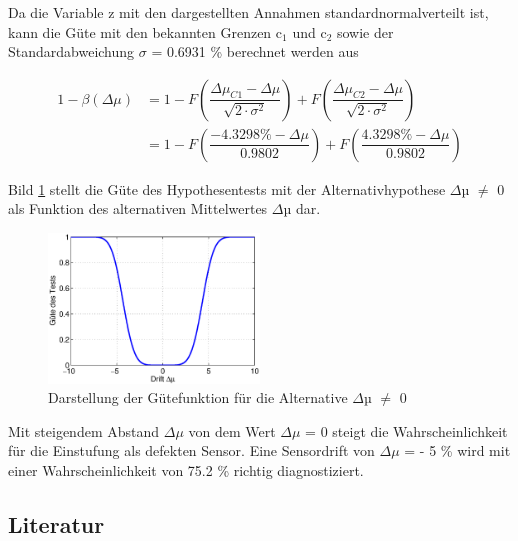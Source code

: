 \noindent Da die Variable z mit den dargestellten Annahmen standardnormalverteilt ist, kann die G\"{u}te mit den bekannten Grenzen c$_{1}$ und c$_{2}$ sowie der Standardabweichung $\sigma$ = 0.6931 \% berechnet werden aus 

\begin{equation}\label{eq:sixonehundredseventysix}
\begin{split}
1-\beta \left(\Delta \mu \right) & = 1-F\left(\dfrac{\Delta \mu _{C1} -\Delta \mu }{\sqrt{2\cdot \sigma ^{2}}} \right)+F\left(\dfrac{\Delta \mu _{C2} -\Delta \mu }{\sqrt{2\cdot \sigma ^{2}}} \right) \\ 
& = 1-F\left(\dfrac{-4.3298 \% -\Delta \mu }{0.9802} \right)+F\left(\dfrac{4.3298 \% -\Delta \mu }{0.9802} \right)   
\end{split}
\end{equation}

Bild \ref{fig:DiagnoseFeuchtesensor4} stellt die G\"{u}te des Hypothesentests mit der Alternativhypothese $\Delta$µ $\neq$ 0 als Funktion des alternativen Mittelwertes $\Delta$µ dar. 

\noindent 
\begin{figure}[H]
  \centerline{\includegraphics[width=0.5\textwidth]{Kapitel6/Bilder/image17}}
  \caption{Darstellung der G\"{u}tefunktion f\"{u}r die Alternative $\Delta$µ $\neq$ 0}
  \label{fig:DiagnoseFeuchtesensor4}
\end{figure}

\noindent Mit steigendem Abstand $\Delta\mu$ von dem Wert $\Delta\mu$ = 0 steigt die Wahrscheinlichkeit f\"{u}r die Einstufung als defekten Sensor. Eine Sensordrift von $\Delta\mu$ = - 5 \% wird mit einer Wahrscheinlichkeit von 75.2 \% richtig diagnostiziert.

\clearpage

\subsection{Literatur}

